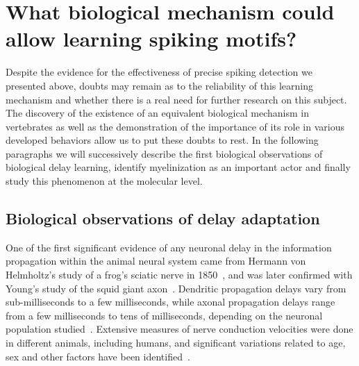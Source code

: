 \documentclass[brainsci, %
               review,submit,pdftex,moreauthors
               ]{Definitions/mdpi}
\begin{document}
\section{What biological mechanism could allow learning spiking motifs?}
%
Despite the evidence for the effectiveness of precise spiking detection we presented above, doubts may remain as to the reliability of this learning mechanism and whether there is a real need for further research on this subject. The discovery of the existence of an equivalent biological mechanism in vertebrates as well as the demonstration of the importance of its role in various developed behaviors allow us to put these doubts to rest. In the following paragraphs we will successively describe the first biological observations of biological delay learning, identify myelinization as an important actor and finally study this phenomenon at the molecular level. 

\subsection{Biological observations of delay adaptation}

One of the first significant evidence of any neuronal delay in the information propagation within the animal neural system came from Hermann von Helmholtz's study of a frog's sciatic nerve in 1850~\citep{von_helmholz_messungen_1850,peyrard_how_2020}, and was later confirmed with Young's study of the squid giant axon~\citep{young_functioning_1938}. Dendritic propagation delays vary from sub-milliseconds to a few milliseconds, while axonal propagation delays range from a few milliseconds to tens of milliseconds, depending on the neuronal population studied~\citep{madadi_asl_dendritic_2018}. Extensive measures of nerve conduction velocities were done in different animals, including humans, and significant variations related to age, sex and other factors have been identified~\citep{stetson_effects_1992}.
\end{document}
